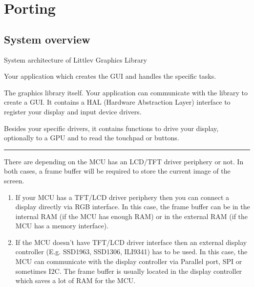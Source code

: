 \documentclass[letterpaper,10pt,english]{sphinxmanual}
\begin{document}
\section{Porting}
\label{\detokenize{porting/index::doc}}\label{\detokenize{porting/index:porting}}

\subsection{System overview}
\label{\detokenize{porting/sys::doc}}\label{\detokenize{porting/sys:system-overview}}
System architecture of Littlev Graphics Library

Your application which creates the GUI and handles the specific tasks.

The graphics library itself. Your application can communicate with the library to create a GUI. It contains a HAL (Hardware Abstraction Layer) interface to register your display and input device drivers.

Besides your specific drivers, it contains functions to drive your display, optionally to a GPU and to read the touchpad or buttons.


\bigskip\hrule\bigskip


There are  depending on the MCU has an LCD/TFT driver periphery or not. In both cases, a frame buffer will be required to store the current image of the screen.
\begin{enumerate}
\item {} 
If your MCU has a TFT/LCD driver periphery then you can connect a display directly via RGB interface.
In this case, the frame buffer can be in the internal RAM (if the MCU has enough RAM) or in the external RAM (if the MCU has a memory interface).

\item {} 
If the MCU doesn’t have TFT/LCD driver interface then an external display controller (E.g. SSD1963, SSD1306, ILI9341) has to be used.
In this case, the MCU can communicate with the display controller via Parallel port, SPI or sometimes I2C.
The frame buffer is usually located in the display controller which saves a lot of RAM for the MCU.

\end{enumerate}
\end{document}
